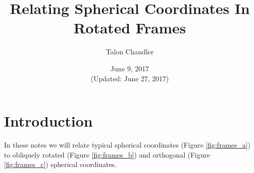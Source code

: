 \documentclass[11pt]{article}
\begin{document}
\title{\vspace{-2.5em} Relating Spherical Coordinates In Rotated Frames\vspace{-1em}} \author{Talon Chandler}%
\date{\vspace{-1em}June 9, 2017\\ (Updated: June 27, 2017)\vspace{-1em}}
\maketitle

\section{Introduction}
In these notes we will relate typical spherical coordinates (Figure
\ref{fig:frames_a}) to obliquely rotated (Figure \ref{fig:frames_b}) and
orthogonal (Figure \ref{fig:frames_c}) spherical coordinates.
\end{document}
